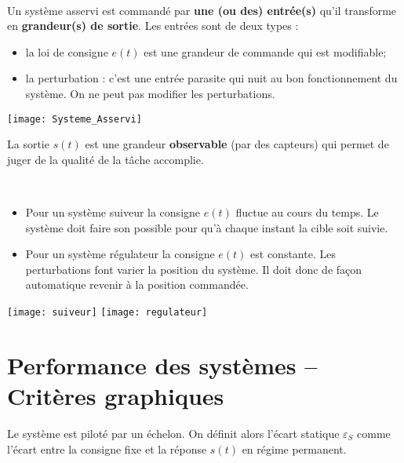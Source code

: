 \begin{defi} ~\\

\noindent\begin{minipage}[c]{11cm}
Un système asservi est commandé par \textbf{une (ou des) entrée(s)} qu'il
transforme en \textbf{grandeur(s) de sortie}.
Les entrées sont de deux types : 
\begin{itemize}
 \item la loi de consigne $e(t)$ est une grandeur de commande qui est
modifiable;
\item la perturbation : c'est une entrée parasite qui nuit au bon
fonctionnement du système. On ne peut pas modifier les perturbations.
\end{itemize}
\end{minipage} \hfill
\begin{minipage}[c]{5cm}
\texttt{[image: Systeme\_Asservi]}
\end{minipage}

\noindent
La sortie $s(t)$ est une grandeur \textbf{observable} (par des capteurs) qui
permet de juger de la qualité de la tâche accomplie.


\end{defi} 


\begin{defi} ~\\
\begin{itemize}[label=,font=\color{ocre}] 
\item Pour un système suiveur la consigne $e(t)$ fluctue au cours du temps. Le système doit faire son possible pour qu'à chaque instant la cible soit suivie.
\item Pour un système régulateur la consigne $e(t)$ est constante. Les perturbations font varier la position du système. Il doit donc de façon automatique revenir à la position commandée.
\end{itemize}
\end{defi}


\begin{center}
%
\texttt{[image: suiveur]}
\hspace{2cm}
%
\texttt{[image: regulateur]}
\end{center}



\section{Performance des systèmes -- Critères graphiques}
\begin{defi}

Le système est piloté par un échelon. On définit alors l'écart statique $\varepsilon_S$ comme l'écart entre la consigne fixe et la réponse $s(t)$ en régime permanent.
\end{defi}

